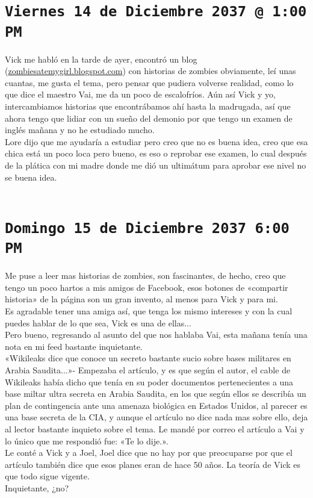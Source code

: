 \section*{\texttt{Viernes 14 de Diciembre 2037 @ 1:00 PM}}
\vspace*{1.5cm}

Vick me habló en la tarde de ayer, encontró un blog (\url{zombiesatemygirl.blogspot.com}) con historias de zombies 
obviamente, leí unas cuantas, me gusta el tema, pero pensar que pudiera volverse realidad, como lo que dice el maestro Vai, me da un poco de escalofríos. Aún así Vick y yo, intercambiamos historias que encontrábamos ahí hasta la madrugada, así que ahora tengo que lidiar con un sueño del demonio por que tengo un examen de 
inglés mañana y no he estudiado mucho.\\
Lore dijo que me ayudaría a estudiar pero creo que no es buena idea, creo que esa chica está un poco loca pero bueno, es eso o reprobar ese examen, lo cual después de la plática con mi madre donde me dió un ultimátum para aprobar ese nivel no se buena idea.\\\\

\vspace*{1.5cm}
\section*{\texttt{Domingo 15 de Diciembre 2037 6:00 PM}}
\vspace*{1.5cm}
Me puse a leer mas historias de zombies, son fascinantes, de hecho, creo que tengo un poco hartos a mis amigos de Facebook, esos botones de «compartir historia» de la página son un gran invento, al menos para Vick y para mi.\\
Es agradable tener una amiga así, que tenga los mismo intereses y con la cual puedes hablar de lo que sea, 
Vick es una de ellas...\\
Pero bueno, regresando al asunto del que nos hablaba Vai, esta mañana tenía una nota en mi feed bastante inquietante.\\
«Wikileaks dice que conoce un secreto bastante sucio sobre bases militares en Arabia Saudita...»- Empezaba el artículo, y es que según el autor, el cable de Wikileaks había dicho que tenía en su poder documentos 
pertenecientes a una base miltar ultra secreta en Arabia Saudita, en los que según ellos se describía un plan 
de contingencia ante una amenaza biológica en Estados Unidos, al parecer es una base secreta de la CIA, y 
aunque el artículo no dice nada mas sobre ello, deja al lector bastante inquieto sobre el tema. Le mandé por 
correo el artículo a Vai y lo único que me respondió fue: «Te lo dije.».\\
Le conté a Vick y a Joel, Joel dice que no hay por que preocuparse por que el artículo también dice que esos 
planes eran de hace 50 años. La teoría de Vick es que todo sigue vigente.\\
Inquietante, ¿no? \\\\


